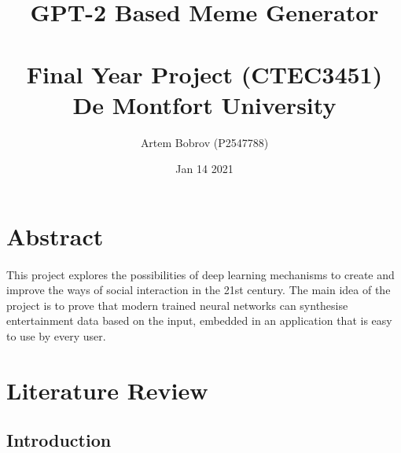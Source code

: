 \documentclass[12pt]{report}
\title{%
      GPT-2 Based Meme Generator\\~\\
      \large Final Year Project (CTEC3451) \\
        De Montfort University}
\author{Artem Bobrov (P2547788)}
\date{Jan 14 2021}
\begin{document}
    \maketitle
    \thispagestyle{empty}
    \clearpage
    \tableofcontents
    \setcounter{tocdepth}{1}
    \thispagestyle{empty}
    \clearpage
    \section*{Abstract}
    
    \paragraph{}
    
    This project explores the possibilities of deep learning mechanisms to create and improve the ways of 
    social interaction in the 21st century. The main idea of the project is to prove that modern trained neural networks can 
    synthesise entertainment data based on the input, embedded in an application that is easy to use by every user.
    
    
    \section*{Literature Review}

    \subsection*{Introduction}
    \paragraph{}
    
\end{document}

